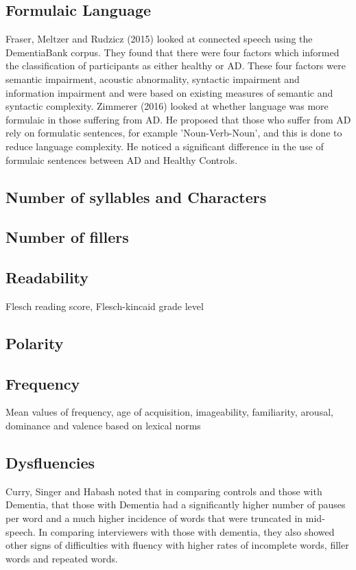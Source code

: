 \subsection{Formulaic Language}
Fraser, Meltzer and Rudzicz (2015) \cite{Fraser2015} looked at connected speech using the DementiaBank corpus. They found that there were four factors which informed the classification of participants as either healthy or AD. These four factors were semantic impairment, acoustic abnormality, syntactic impairment and information impairment and were based on existing measures of semantic and syntactic complexity. Zimmerer (2016) \cite{Zimmerer2016} looked at whether language was more formulaic in those suffering from AD. He proposed that those who suffer from AD rely on formulatic sentences, for example 'Noun-Verb-Noun', and this is done to reduce language complexity. He noticed a significant difference in the use of formulaic sentences between AD and Healthy Controls. \newline


\subsection{Number of syllables and Characters}

\subsection{Number of fillers}

\subsection{Readability}
Flesch reading score, Flesch-kincaid grade level

\subsection{Polarity}

\subsection{Frequency}
Mean values of frequency, age of acquisition, imageability, familiarity, arousal, dominance and valence based on lexical norms

\subsection{Dysfluencies}
Curry, Singer and Habash noted that in comparing controls and those with Dementia, that those with Dementia had a significantly higher number of pauses per word and a much higher incidence of words that were truncated in mid-speech. In comparing interviewers with those with dementia, they also showed other signs of difficulties with fluency with higher rates of incomplete words, filler words and repeated words. 

